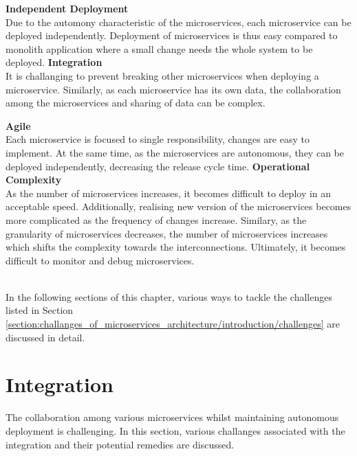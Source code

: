 \begin{multicols}{2}
  \textbf{Independent Deployment} \\Due to the automony characteristic of the microservices, each microservice can be deployed independently. Deployment of microservices is thus easy compared to monolith application where a small change needs the whole system to be deployed.\cite{Newman:2015aa}
  \vfill
  \columnbreak
  \textbf{Integration} \\It is challanging to prevent breaking other microservices when deploying a microservice. Similarly, as each microservice has its own data, the collaboration among the microservices and sharing of data can be complex.
   \end{multicols}
   
  \begin{multicols}{2}
  \textbf{Agile}\\ Each microservice is focused to single responsibility, changes are easy to implement. At the same time, as the microservices are autonomous, they can be deployed independently, decreasing the release cycle time.
  \vfill
  \columnbreak
  \textbf{Operational Complexity} \\ As the number of microservices increases, it becomes difficult to deploy in an acceptable speed. Additionally, realising new version of the microservices becomes more complicated as the frequency of changes increase. Similary, as the granularity of microservices decreases, the number of microservices increases which shifts the complexity towards the interconnections. Ultimately, it becomes difficult to monitor and debug microservices.
   \end{multicols}
\\
In the following sections of this chapter, various ways to tackle the challenges listed in Section \ref{section:challanges_of_microservices_architecture/introduction/challenges} are discussed in detail.

\section{Integration}\label{section:challanges_of_microservices_architecture/integration}
The collaboration among various microservices whilst maintaining autonomous deployment is challenging. In this section, various challanges associated with the integration and their potential remedies are discussed.

